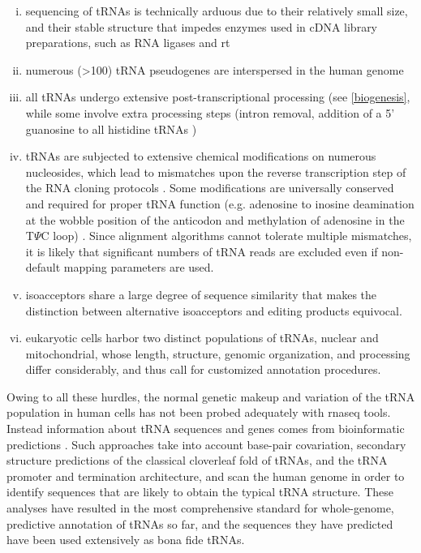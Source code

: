 \documentclass[12pt]{rockefeller}
\begin{document}
\begin{enumerate}[i)]
\item sequencing of tRNAs is technically arduous due to their relatively small size, and their stable structure that impedes enzymes used in cDNA library preparations, such as RNA ligases and \gls{rt}
\item numerous (>100) tRNA pseudogenes are interspersed in the human genome \cite{Lowe:1997uc,Chan:2009dz}
\item all tRNAs undergo extensive post-transcriptional processing (see \ref{biogenesis}, while some involve extra processing steps (intron removal, addition of a 5’ guanosine to all histidine tRNAs \cite{Gu:2003jj})
\item tRNAs are subjected to extensive chemical modifications on numerous nucleosides, which lead to mismatches upon the reverse transcription step of the RNA cloning protocols \cite{Jackman:2012ki,Lee:2013cg}. Some modifications are universally conserved and required for proper tRNA function (e.g. adenosine to inosine deamination at the wobble position of the anticodon and methylation of adenosine in the T$\Psi$C loop) \cite{Jackman:2012ki,Gustilo:2008ge}. Since alignment algorithms cannot tolerate multiple mismatches, it is likely that significant numbers of tRNA reads are excluded even if non-default mapping parameters are used.
\item \glspl{isoacceptor} share a large degree of sequence similarity that makes the distinction between alternative isoacceptors and editing products equivocal. 
\item eukaryotic cells harbor two distinct populations of tRNAs, nuclear and mitochondrial, whose length, structure, genomic organization, and processing differ considerably, and thus call for customized annotation procedures.
\end{enumerate}

Owing to all these hurdles, the normal genetic makeup and variation of the tRNA population in human cells has not been probed adequately with \gls{rnaseq} tools. Instead information about tRNA sequences and genes comes from bioinformatic predictions \cite{Lowe:1997uc,Chan:2009dz}. Such approaches take into account base-pair covariation, secondary structure predictions of the classical cloverleaf fold of tRNAs, and the tRNA promoter and termination architecture, and scan the human genome in order to identify sequences that are likely to obtain the typical tRNA structure. These analyses have resulted in the most comprehensive standard for whole-genome, predictive annotation of tRNAs so far, and the sequences they have predicted have been used extensively as bona fide tRNAs.
\end{document}
